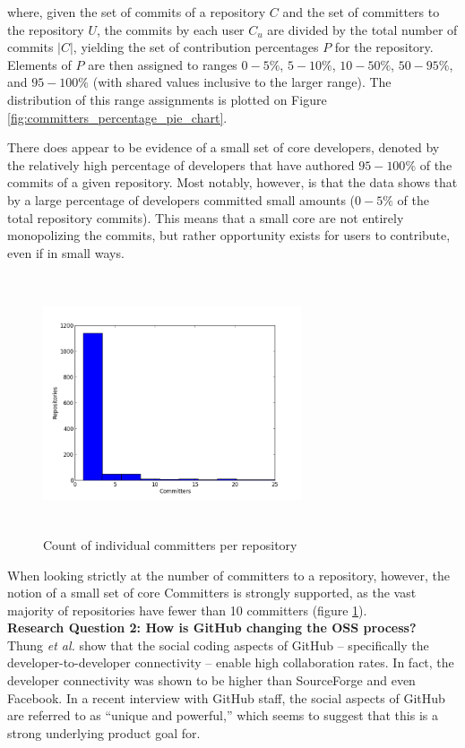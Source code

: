 \documentclass{proc}
\begin{document}
where, given the set of commits of a repository $C$ and the set of committers to the repository $U$, the commits by each user $C_u$ are divided by the total number of commits $|C|$, yielding the set of contribution percentages $P$ for the repository. Elements of $P$ are then assigned to ranges $0-5\%$, $5-10\%$, $10-50\%$, $50-95\%$, and $95-100\%$ (with shared values inclusive to the larger range). The distribution of this range assignments is plotted on Figure \ref{fig:committers_percentage_pie_chart}.

There does appear to be evidence of a small set of core developers, denoted by the relatively high percentage of developers that have authored $95-100\%$ of the commits of a given repository. Most notably, however, is that the data shows that by a large percentage of developers committed small amounts ($0-5\%$ of the total repository commits). This means that a small core are not entirely monopolizing the commits, but rather opportunity exists for users to contribute, even if in small ways.

\begin{figure}
\includegraphics[height=3in,width=3in]{images/committers_histogram.png}
\caption{Count of individual committers per repository}
\label{fig:committers_histogram}
\end{figure}

When looking strictly at the number of committers to a repository, however, the notion of a small set of core Committers is strongly supported, as the vast majority of repositories have fewer than 10 committers (figure \ref{fig:committers_histogram}).\\

\textbf{Research Question 2: How is GitHub changing the OSS process?}\\
Thung \textit{et al.} show that the social coding aspects of GitHub -- specifically the developer-to-developer connectivity -- enable high collaboration rates.\cite{thung2013network} In fact, the developer connectivity was shown to be higher than SourceForge and even Facebook. In a recent interview with GitHub staff, the social aspects of GitHub are referred to as ``unique and powerful\cite{begel2013social},'' which seems to suggest that this is a strong underlying product goal for.
\end{document}
